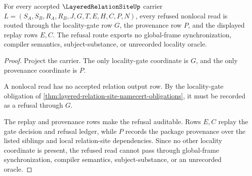 \begin{theorem}
\label{thm:layered-relation-site-locality-refusal-provenance}
For every accepted $\LayeredRelationSiteUp$ carrier $L=(S_A,S_B,R_A,R_B,J,G,T,E,H,C,P,N)$, every refused nonlocal read is routed through the locality-gate row $G$, the provenance row $P$, and the displayed replay rows $E,C$. The refusal route exports no global-frame synchronization, compiler semantics, subject-substance, or unrecorded locality oracle.
\end{theorem}
\begin{proof}
Project the carrier. The only locality-gate coordinate is $G$, and the only provenance coordinate is $P$.

A nonlocal read has no accepted relation output row. By the locality-gate obligation of \autoref{thm:layered-relation-site-namecert-obligations}, it must be recorded as a refusal through $G$.

The replay and provenance rows make the refusal auditable. Rows $E,C$ replay the gate decision and refusal ledger, while $P$ records the package provenance over the listed siblings and local relation-site dependencies. Since no other locality coordinate is present, the refused read cannot pass through global-frame synchronization, compiler semantics, subject-substance, or an unrecorded oracle.
\end{proof}

